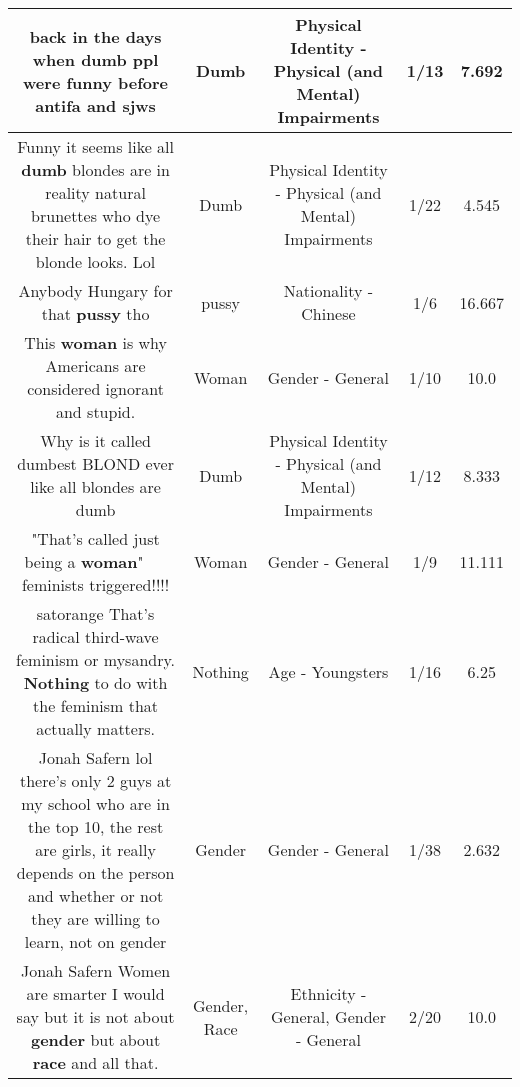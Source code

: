 \documentclass[11pt]{article}
\newlength\mylength
\begin{document}
\begin{center}
\begin{longtable}{|C{.65\mylength}|C{.30\mylength}|C{.12\mylength}|C{.12\mylength}|C{.12\mylength}|}
  \small back in the days when \textbf{dumb} ppl were funny before antifa and sjws\normalsize   & Dumb & Physical Identity - Physical (and Mental) Impairments & 1/13 & 7.692 \\  \hline
  \small Funny it seems like all \textbf{dumb} blondes are in reality natural brunettes who dye their hair to get the blonde looks. Lol\normalsize   & Dumb & Physical Identity - Physical (and Mental) Impairments & 1/22 & 4.545 \\  \hline
  \small Anybody Hungary for that \textbf{pussy} tho\normalsize   & pussy & Nationality - Chinese & 1/6 & 16.667 \\  \hline
  \small This \textbf{woman} is why Americans are considered ignorant and stupid.\normalsize   & Woman & Gender - General & 1/10 & 10.0 \\  \hline
  \small Why is it called dumbest BLOND ever like all blondes are dumb\normalsize   & Dumb & Physical Identity - Physical (and Mental) Impairments & 1/12 & 8.333 \\  \hline
  \small "That's called just being a \textbf{woman}" 🤣🤣🤣🤣 feminists triggered!!!!\normalsize   & Woman & Gender - General & 1/9 & 11.111 \\  \hline
  \small satorange That's radical third-wave feminism or mysandry. \textbf{Nothing} to do with the feminism that actually matters.\normalsize   & Nothing & Age - Youngsters & 1/16 & 6.25 \\  \hline
  \small Jonah Safern lol there's only 2 guys at my school who are in the top 10, the rest are girls, it really depends on the person and whether or not they are willing to learn, not on gender\normalsize   & Gender & Gender - General & 1/38 & 2.632 \\  \hline
  \small Jonah Safern Women are smarter I would say but it is not about \textbf{gender} but about \textbf{race} and all that.\normalsize   & Gender, Race & Ethnicity - General, Gender - General & 2/20 & 10.0 \\  \hline

\end{longtable}
\end{center}
\end{document}
